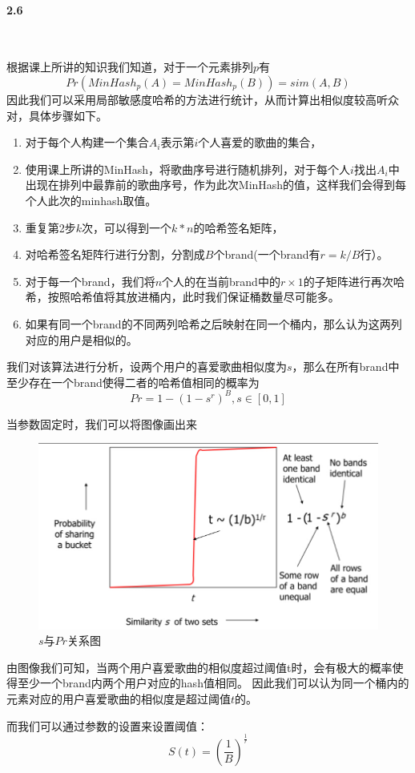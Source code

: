 \paragraph{2.6}~{}

根据课上所讲的知识我们知道，对于一个元素排列$p$有
$$Pr(MinHash_p(A) = MinHash_p(B)) = sim(A,B)$$
因此我们可以采用局部敏感度哈希的方法进行统计，从而计算出相似度较高听众对，具体步骤如下。
\begin{enumerate}
\item 对于每个人构建一个集合$A_i$表示第$i$个人喜爱的歌曲的集合，
\item 使用课上所讲的MinHash，将歌曲序号进行随机排列，对于每个人$i$找出$A_i$中出现在排列中最靠前的歌曲序号，作为此次MinHash的值，这样我们会得到每个人此次的minhash取值。
\item 重复第2步$k$次，可以得到一个$k * n$的哈希签名矩阵，
\item 对哈希签名矩阵行进行分割，分割成$B$个brand(一个brand有$r = k/B$行）。
\item 对于每一个brand，我们将$n$个人的在当前brand中的$r \times 1$的子矩阵进行再次哈希，按照哈希值将其放进桶内，此时我们保证桶数量尽可能多。
\item 如果有同一个brand的不同两列哈希之后映射在同一个桶内，那么认为这两列对应的用户是相似的。
\end{enumerate}
我们对该算法进行分析，设两个用户的喜爱歌曲相似度为$s$，那么在所有brand中至少存在一个brand使得二者的哈希值相同的概率为
$$Pr = 1-(1-s^r)^B, s \in [0,1]$$

当参数固定时，我们可以将图像画出来
\begin{figure}[H]
    \centering
    \includegraphics[width=5in]{img/img1.png}
    \caption{$s$与$Pr$关系图}
\end{figure}
由图像我们可知，当两个用户喜爱歌曲的相似度超过阈值t时，会有极大的概率使得至少一个brand内两个用户对应的hash值相同。
因此我们可以认为同一个桶内的元素对应的用户喜爱歌曲的相似度是超过阈值$t$的。

而我们可以通过参数的设置来设置阈值：
$$S(t) = (\frac{1}{B})^{\frac{1}{r}}$$

